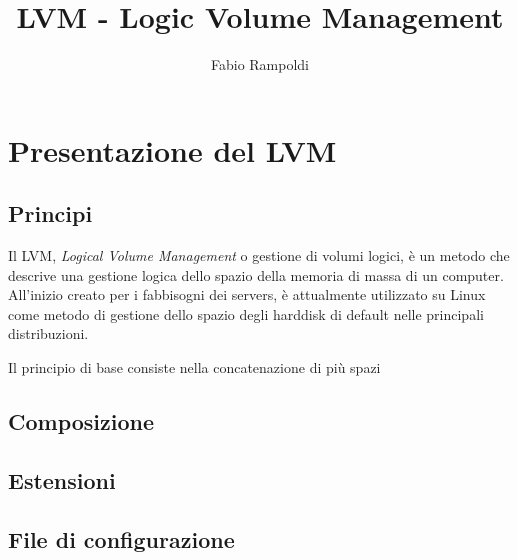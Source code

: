 \documentclass[a4paper,12pt]{article}
\title{LVM - Logic Volume Management}
\author{Fabio Rampoldi}
\begin{document}
\maketitle
\pagebreak 
\tableofcontents
\pagebreak 

\section{Presentazione del LVM}
\subsection{Principi}
Il LVM, \textit{Logical Volume Management} o gestione di volumi logici, è un metodo che descrive una gestione logica dello spazio della memoria di massa di un computer. All'inizio creato per i fabbisogni dei servers, è attualmente utilizzato su Linux come metodo di gestione dello spazio degli harddisk di default nelle principali distribuzioni.

Il principio di base consiste nella concatenazione di più spazi 
\subsection{Composizione}
\subsection{Estensioni}
\subsection{File di configurazione}
\end{document}
